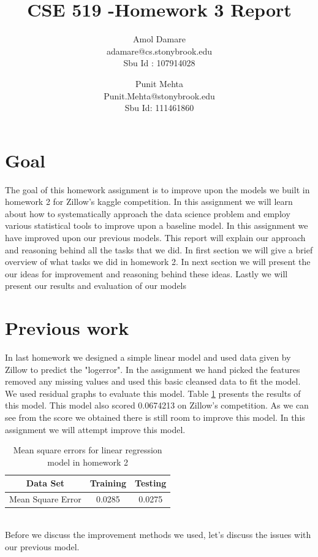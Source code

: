 \documentclass[a4paper, 11pt]{article}
\begin{document}
\title{ CSE 519 -Homework 3 Report}
\author{Amol Damare \\ adamare@cs.stonybrook.edu \\Sbu Id : 107914028
\and
Punit Mehta\\ Punit.Mehta@stonybrook.edu \\Sbu Id: 111461860}

\maketitle
\section{Goal}
The goal of this homework assignment is to improve upon the models we built in homework 2 for Zillow's kaggle competition. In this assignment we will learn about how to systematically approach the data science problem and employ various statistical tools to improve upon a baseline model. In this assignment we have improved upon our previous models. This report will explain our approach and reasoning behind all the tasks that we did. In first section we will give a brief overview of what tasks we did in homework 2. In next section we will present the our ideas for improvement and reasoning behind these ideas. Lastly we will present our results and evaluation of our models
\section{Previous work}
In last homework we designed a simple linear model and used data given by Zillow to predict the "logerror". In the assignment we hand picked the features removed any missing values and used this basic cleansed data to fit the model. We used residual graphs to evaluate this model. Table \ref{table:1} presents the results of this model. This model also scored  0.0674213 on Zillow's competition. As we can see from the score we obtained there is still room to improve this model. In this assignment we will attempt improve this model. 
\begin{table}[h!]
\centering
\begin{tabular}{||c c c ||} 
 \hline
 Data Set & Training &  Testing \\ [0.5ex] 
 \hline\hline
 Mean Square Error & 0.0285  & 0.0275 \\ [1ex] 
 \hline
\end{tabular}
\caption{Mean square errors for linear regression model in homework 2}
\label{table:1}
\end{table}
\\
Before we discuss the improvement methods we used, let's discuss the issues with our previous model.
\end{document}
